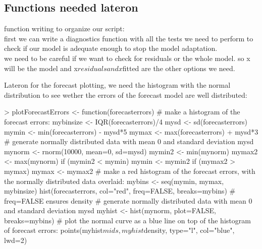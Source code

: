 \documentclass[11pt, a4paper]{article} %
\begin{document}
\subsection{Functions needed lateron}
function writing to organize our script:\\
\noindent first we can write a diagnostics function with all the tests we need to perform to check if our model is adequate enough to stop the model adaptation.\\
we need to be careful if we want to check for residuals or the whole model.
so x will be the model and x$residuals and x$fitted are the other options we need.\\


\begin{Schunk}
\end{Schunk}
\noindent Lateron for the forecast plotting, we need the histogram with the normal distribution to see wether the errors of the forecast model are well distributed:


\begin{Schunk}
\begin{Sinput}
> plotForecastErrors <- function(forecasterrors)
 {
 # make a histogram of the forecast errors:
 mybinsize <- IQR(forecasterrors)/4
 mysd <- sd(forecasterrors)
 mymin <- min(forecasterrors) - mysd*5
 mymax <- max(forecasterrors) + mysd*3
 # generate normally distributed data with mean 0 and standard deviation mysd
 mynorm <- rnorm(10000, mean=0, sd=mysd)
 mymin2 <- min(mynorm)
 mymax2 <- max(mynorm)
 if (mymin2 < mymin) { mymin <- mymin2 }
 if (mymax2 > mymax) { mymax <- mymax2 }
 # make a red histogram of the forecast errors, with the normally distributed data overlaid:
 mybins <- seq(mymin, mymax, mybinsize)
 hist(forecasterrors, col="red", freq=FALSE, breaks=mybins)
 # freq=FALSE ensures density
 # generate normally distributed data with mean 0 and standard deviation mysd
 myhist <- hist(mynorm, plot=FALSE, breaks=mybins)
 # plot the normal curve as a blue line on top of the histogram of forecast errors:
 points(myhist$mids, myhist$density, type="l", col="blue", lwd=2)
 }
\end{Sinput}
\end{Schunk}
\end{document}

